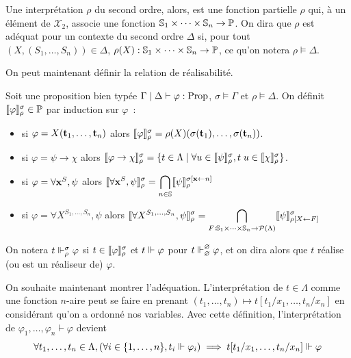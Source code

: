 \documentclass{article}
\begin{document}
Une interprétation $\rho$ du second ordre, alors, est une fonction partielle $\rho$ qui, à un élément de $\mathcal X_2$, associe une fonction $\mathbb{S}_1\times\cdots\times\mathbb{S}_n \to \mathbb{P}$. On dira que $\rho$ est adéquat pour un contexte du second ordre $\Delta$ si, pour tout $(X, (S_1,\ldots,S_n))\in \Delta$, $\rho(X) : \mathbb{S}_1\times\cdots\times\mathbb{S}_n \to \mathbb{P}$, ce qu'on notera $\rho \models \Delta$.

On peut maintenant définir la relation de réalisabilité.

\begin{defi}
    Soit une proposition bien typée $\Gamma\mid\Delta\vdash\varphi : \mathrm{Prop}$, $\sigma\models \Gamma$ et $\rho\models \Delta$. On définit $\llbracket \varphi \rrbracket_\rho^\sigma \in \mathcal {\mathbb{P}}$ par induction sur $\varphi$~:
    \begin{itemize}
        \item si $\varphi = X(\mathbf{t}_1,\ldots,\mathbf{t}_n)$ alors $\llbracket \varphi \rrbracket_\rho^\sigma = \rho(X)(\sigma(\mathbf{t}_1),\ldots,\sigma(\mathbf{t}_n))$.
        \item si $\varphi = \psi \to \chi$ alors $\llbracket \varphi\to\chi \rrbracket_\rho^\sigma = \{t \in \Lambda\mid \forall u \in \llbracket \psi \rrbracket_\rho^\sigma, t\;u \in \llbracket \chi \rrbracket_\rho^\sigma\}$.
        \item si $\varphi = \forall \mathbf{x}^S, \psi$ alors $\displaystyle\llbracket \forall \mathbf{x}^S, \psi \rrbracket_\rho^\sigma = \bigcap_{n \in \mathbb{S}} \llbracket \psi \rrbracket_\rho^{\sigma[\mathbf{x}\leftarrow n]}$
        \item si $\varphi = \forall X^{S_1,\ldots,S_n}, \psi$ alors $\displaystyle\llbracket \forall X^{S_1,\ldots,S_n},\psi \rrbracket_\rho^\sigma = \bigcap_{F : \mathbb{S}_1\times\cdots\times\mathbb{S}_n \to \mathcal P(\Lambda)} \llbracket \psi \rrbracket_{\rho[X\leftarrow F]}^\sigma$
    \end{itemize}

    On notera $t\Vdash_\rho^\sigma \varphi$ si $t\in\llbracket \varphi \rrbracket_\rho^\sigma$ et $t\Vdash\varphi$ pour $t\Vdash_\varnothing^\varnothing\varphi$, et on dira alors que $t$ réalise (ou est un réaliseur de) $\varphi$.
\end{defi}

On souhaite maintenant montrer l'adéquation. L'interprétation de $t\in \Lambda$ comme une fonction $n$-aire peut se faire en prenant $(t_1,\ldots,t_n) \mapsto t[t_1/x_1,\ldots,t_n/x_n]$ en considérant qu'on a ordonné nos variables. Avec cette définition, l'interprétation de $\varphi_1,\ldots,\varphi_n\vdash \varphi$ devient
\[\forall t_1,\ldots,t_n \in \Lambda, (\forall i \in \{1,\ldots,n\}, t_i \Vdash \varphi_i)\implies t[t_1/x_1,\ldots,t_n/x_n]\Vdash\varphi\]
\end{document}
